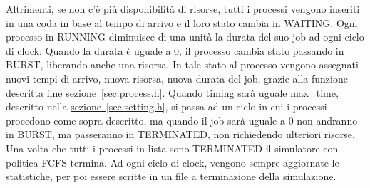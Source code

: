 \documentclass[Lau, oneside]{sapthesis}%
\begin{document}
Altrimenti, se non c'è più disponibilità di risorse, tutti i processi vengono inseriti in una coda in base al tempo di arrivo e il loro stato cambia in WAITING.
Ogni processo in RUNNING diminuisce di una unità la durata del suo job ad ogni ciclo di clock.
Quando la durata è uguale a 0, il processo cambia stato passando in BURST, liberando anche una risorsa.
In tale stato al processo vengono assegnati nuovi tempi di arrivo, nuova risorsa, nuova durata del job, grazie alla funzione descritta fine \hyperref[sec:process.h]{sezione~\ref*{sec:process.h}}.
Quando timing sarà uguale max\_time, descritto nella \hyperref[sec:setting.h]{sezione~\ref*{sec:setting.h}}, si passa ad un ciclo in cui i processi procedono come sopra descritto, ma quando il job sarà uguale a 0 non andranno in BURST, ma passeranno in TERMINATED, non richiedendo ulteriori risorse.
Una volta che tutti i processi in lista sono TERMINATED il simulatore con politica FCFS termina.
Ad ogni ciclo di clock, vengono sempre aggiornate le statistiche, per poi essere scritte in un file a terminazione della simulazione.
\end{document}
